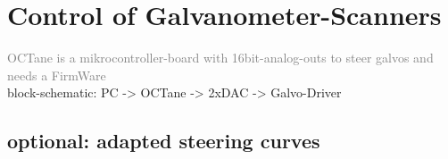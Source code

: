 \section{Control of Galvanometer-Scanners}

\textcolor{gray}{OCTane is a mikrocontroller-board with 16bit-analog-outs to steer galvos and needs a FirmWare \\ }
block-schematic: PC -> OCTane -> 2xDAC -> Galvo-Driver

\subsection{optional: adapted steering curves}
